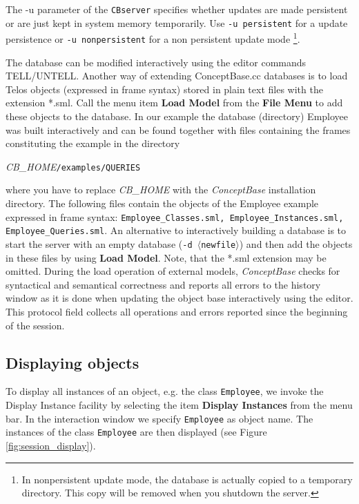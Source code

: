 The -u parameter of the {\tt CBserver} specifies whether updates are made
persistent or are just kept in system memory temporarily. Use {\tt -u
persistent} for a update persistence or {\tt -u nonpersistent} for a
non persistent update mode \footnote{In nonpersistent update mode, the database
is actually copied to a temporary directory. This copy will be removed
when you shutdown the server.}.

The database can be modified interactively using the editor commands
TELL/UNTELL.
Another way of extending ConceptBase.cc databases is to load Telos objects (expressed
in frame syntax) stored in plain text files with the extension  *.sml. Call the menu
item {\bf Load Model} from the {\bf File Menu} to add these objects
to the database. In our example the database (directory)
Employee was built interactively and can be found together with files
containing the frames constituting the example in the directory

\begin{center}	{\em CB\_HOME}{\tt /examples/QUERIES}
\end{center}

\noindent where you have to replace {\em CB\_HOME} with the {\em ConceptBase}  installation directory.  The
following files contain the objects of the Employee example expressed in
frame syntax:  {\tt Employee\-\_Classes.sml, Employee\-\_Instances.sml,
 Employee\-\_Queries.sml}.  An alternative to interactively building a
database is to start the server with an empty database ({\tt -d
}$\langle ${\tt newfile}$\rangle $) and  then add the objects in these files
by using {\bf Load Model}. Note, that the *.sml extension may be omitted.
 During the load operation of external models, {\em ConceptBase}
checks for syntactical and semantical correctness and reports all errors to
the history window as it is done when updating the object base interactively using the
editor. This protocol field collects all operations and errors reported since the beginning of
the session.



\subsection{Displaying objects}


To display all instances of an object, e.g. the class {\tt Employee}, we invoke
the Display Instance facility  by
selecting the item {\bf Display Instances} from the menu bar. In the
interaction window we specify {\tt Employee} as object name. The
instances of the class {\tt Employee} are then displayed (see Figure \ref{fig:session_display}).


